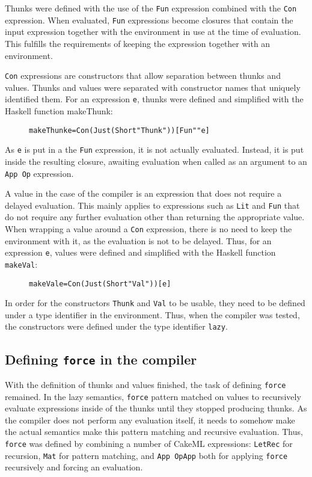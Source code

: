 Thunks were defined with the use of the \texttt{Fun} expression combined
with the \texttt{Con} expression. When evaluated, \texttt{Fun} expressions
become closures that contain the input expression together with the environment
in use at the time of evaluation. This fulfills the requirements of keeping
the expression together with an environment.

\texttt{Con} expressions are constructors that allow separation between thunks
and values. Thunks and values were separated with constructor names that
uniquely identified them. For an expression \texttt{e}, thunks were defined and
simplified with the Haskell function makeThunk:

\begin{figure}[H]
\begin{alltt}
  makeThunk e = Con (Just (Short "Thunk")) [Fun "" e]
\end{alltt}
\end{figure}

\noindent As \texttt{e} is put in a the \texttt{Fun} expression, it is not
actually evaluated. Instead, it is put inside the resulting closure, awaiting
evaluation when called as an argument to an \texttt{App Op} expression.

A value in the case of the compiler is an expression that does not require
a delayed evaluation. This mainly applies to expressions such as \texttt{Lit}
and \texttt{Fun} that do not require any further evaluation other than returning
the appropriate value. When wrapping
a value around a \texttt{Con} expression, there
is no need to keep the environment with it, as the evaluation is not to be
delayed. Thus, for an expression \texttt{e}, values were defined and simplified
with the Haskell function \texttt{makeVal}:

\begin{figure}[H]
\begin{alltt}
  makeVal e = Con (Just (Short "Val")) [e]
\end{alltt}
\end{figure}

In order for the constructors \texttt{Thunk} and \texttt{Val} to be usable,
they need to be defined under a type identifier in the environment. Thus,
when the compiler was tested, the constructors were defined under the type
identifier \texttt{lazy}.

\subsection{Defining \texttt{force} in the compiler}
With the definition of thunks and values finished, the task of defining
\texttt{force} remained. In the lazy semantics, \texttt{force} pattern
matched on values to recursively evaluate expressions inside of the thunks until
they stopped producing thunks. As the compiler does not perform any evaluation
itself, it needs to somehow make the actual semantics make this pattern matching
and recursive evaluation. Thus, \texttt{force} was defined by combining a number
of CakeML expressions: \texttt{LetRec} for recursion, \texttt{Mat} for pattern
matching, and \texttt{App OpApp} both for applying \texttt{force} recursively
and forcing an evaluation.

